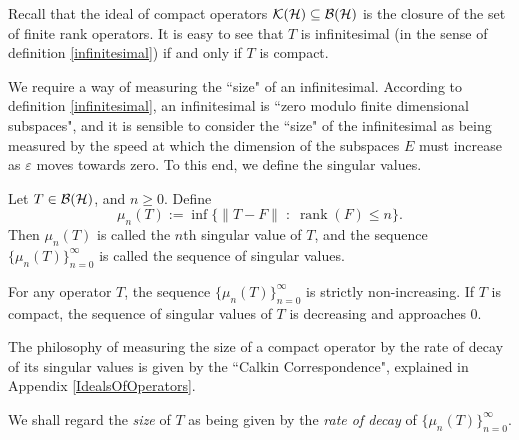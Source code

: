 \begin{remark}
    Recall that the ideal of compact operators $\mathcal{K}(\mathcal{H}) \subseteq \mathcal{B}(\mathcal{H})$
    is the closure of the set of finite rank operators. It is easy to see that $T$
    is infinitesimal (in the sense of definition \ref{infinitesimal}) if and only
    if $T$ is compact.
\end{remark}

We require a way of measuring the ``size" of an infinitesimal. According to
definition \ref{infinitesimal}, an infinitesimal is ``zero modulo finite dimensional
subspaces", and it is sensible to consider the ``size" of the infinitesimal
as being measured by the speed at which the dimension of the subspaces $E$
must increase as $\varepsilon$ moves towards zero. To this end, we define
the singular values.
\begin{definition}
    Let $T \in \mathcal{B}(\mathcal{H})$, and $n \geq 0$. Define
    \begin{equation}
        \mu_n(T) := \inf\{\|T-F\|\;:\;\operatorname{rank}(F) \leq n\}.
    \end{equation}
    Then $\mu_n(T)$ is called the $n$th singular value of $T$, and the sequence
    $\{\mu_n(T)\}_{n=0}^\infty$ is called the sequence of singular values. 
\end{definition}

\begin{remark}
    For any operator $T$, the sequence $\{\mu_n(T)\}_{n=0}^\infty$
    is strictly non-increasing.
    If $T$ is compact, the sequence of singular values of $T$
    is decreasing and approaches $0$. 
    
    The philosophy of measuring the size of a compact operator
    by the rate of decay of its singular values is given
    by the ``Calkin Correspondence", explained in Appendix \ref{IdealsOfOperators}.
\end{remark}

We shall regard the \emph{size} of $T$ as being given by the \emph{rate of decay}
of $\{\mu_n(T)\}_{n=0}^\infty$. 


